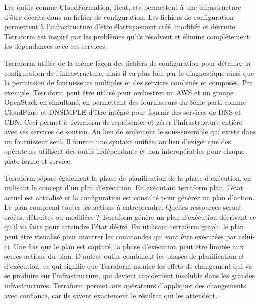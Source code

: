 \documentclass[]{article}
\begin{document}
Les outils comme CloudFormation, Heat, etc permettent à une
infrastructure d'être décrite dans un fichier de configuration. Les
fichiers de configuration permettent à l'infrastructure d'être
élastiquement créé, modifiée et détruite. Terraform est inspiré par les
problèmes qu'ils résolvent et élimine complètement les dépendances avec ces services.

Terraform utilise de la même façon des fichiers de configuration pour
détailler la configuration de l'infrastructure, mais il va plus loin par
le diagnostique ainsi que la permission de fournisseurs multiples et des
services combinés et composés. Par exemple, Terraform peut être utilisé
pour orchestrer un AWS et un groupe OpenStack en simultané, en
permettant des fournisseurs du 3ème parti comme CloudFlare et DNSIMPLE
d'être intégré pour fournir des services de DNS et CDN. Ceci permet à
Terraform de représenter et gérer l'infrastructure entière avec ses
services de soutien. Au lieu de seulement le sous-ensemble qui existe
dans un fournisseur seul. Il fournit une syntaxe unifiée, au lieu
d'exiger que des opérateurs utilisent des outils indépendants et
non-interopérables pour chaque plate-forme et service.

Terraform sépare également la phase de planification de la phase
d'exécution, en utilisant le concept d'un plan d'exécution. En exécutant
terraform plan, l'état actuel est actualisé et la configuration est
consulté pour générer un plan d'action. Le plan comprend toutes les
actions à entreprendre. Quelles ressources seront créées, détruites ou
modifiées ? Terraform génère un plan d'exécution décrivant ce qu'il va
faire pour atteindre l'état désiré. En utilisant terraform graph, le
plan peut être visualisé pour montrer les commandes qui vont être
exécutées par celui-ci. Une fois que le plan est capturé, la phase
d'exécution peut être limitée aux seules actions du plan. D'autres
outils combinent les phases de planification et d'exécution, ce qui
signifie que Terraform montre les effets de changement qui va se
produire sur l'infrastructure, qui devient rapidement insoluble dans les
grandes infrastructures. Terraform permet aux opérateurs d'appliquer des
changements avec confiance, car ils savent exactement le résultat qui les attendent.
\end{document}

